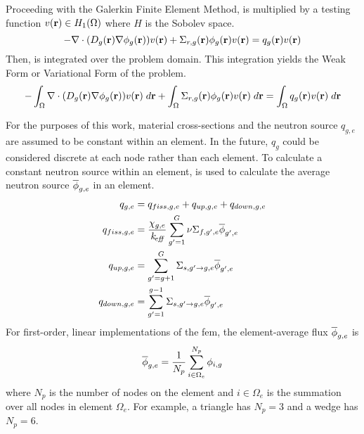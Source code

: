     Proceeding with the Galerkin Finite Element Method,
     is multiplied by a testing function 
    $v(\mathbf{r}) \in H_1(\Omega)$ where $H$ is the Sobolev space. 
    \begin{equation}
      \label{eq:testing_function_multiply}
      -\mathbf{\nabla} \cdot (D_g(\mathbf{r}) \mathbf{\nabla} \phi_g(\mathbf{r})) v(\mathbf{r}) + 
        \Sigma_{r,g}(\mathbf{r}) \phi_g(\mathbf{r}) v(\mathbf{r}) =
        q_g(\mathbf{r}) v(\mathbf{r})
    \end{equation}
    Then,  is integrated over the problem 
    domain. This integration yields the Weak Form or Variational Form of the 
    problem.
    \begin{equation}
      \label{eq:fem_weak_form}
      - \int_{\Omega} \mathbf{\nabla} \cdot (D_g(\mathbf{r}) \mathbf{\nabla} \phi_g(\mathbf{r})) v(\mathbf{r}) \; d\mathbf{r}
        + \int_{\Omega} \Sigma_{r,g}(\mathbf{r}) \phi_g(\mathbf{r}) v(\mathbf{r}) \;d\mathbf{r}=
        \int_{\Omega} q_g(\mathbf{r}) v(\mathbf{r}) \;d\mathbf{r}
    \end{equation}
    
    For the purposes of this work, material cross-sections and the
    neutron source $q_{g,e}$ are assumed to be constant within an element. In
    the future, $q_g$ could be considered discrete at each node rather than each
    element.
    To calculate a constant neutron source within an element,  is
    used to calculate the average neutron source $\overline{\phi}_{g,e}$ in an element.
    \begin{align}
      q_{g,e} &= q_{fiss,g,e} + q_{up,g,e} + q_{down,g,e} \\
      \label{eq:qelement_fiss}
      q_{fiss,g,e} &= \frac{\chi_{g,e}}{k_{\!\mbox{\scriptsize \em eff}}} \sum_{g'=1}^G \nu
        \Sigma_{f,g',e} \overline{\phi}_{g',e} \\
      \label{eq:qelement_up}
      q_{up,g,e} &= \sum_{g'=g+1}^G \Sigma_{s,g' \rightarrow g,e}
        \overline{\phi}_{g',e}\\
      \label{eq:qelement_down}
      q_{down,g,e} &= \sum_{g'=1}^{g-1} \Sigma_{s,g' \rightarrow g,e}
        \overline{\phi}_{g',e}
    \end{align}
    For first-order, linear implementations of the \gls{fem}, the 
    element-average flux $\overline{\phi}_{g,e}$ is
    \begin{equation}
      \label{eq:phiavg}
      \overline{\phi}_{g,e} = \frac{1}{N_p} \sum_{i \in \Omega_e}^{N_p} \phi_{i,g}
    \end{equation}
    where $N_p$ is the number of nodes on the element and $i \in
    \Omega_e$ is the summation over all nodes in element $\Omega_e$. For 
    example, a triangle has $N_p = 3$ and a wedge has $N_p = 6$.

